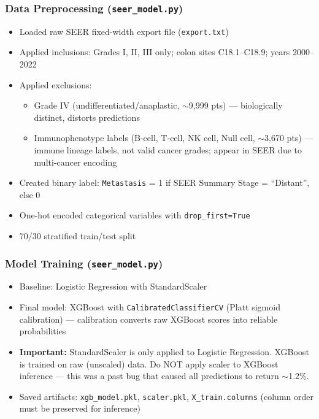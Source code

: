 \documentclass[11pt,letterpaper]{article}
\begin{document}
\subsubsection{Data Preprocessing (\texttt{seer\_model.py})}
\begin{itemize}
  \item Loaded raw SEER fixed-width export file (\texttt{export.txt})
  \item Applied inclusions: Grades I, II, III only; colon sites C18.1–C18.9;
        years 2000–2022
  \item Applied exclusions:
    \begin{itemize}
      \item Grade IV (undifferentiated/anaplastic, $\sim$9,999 pts) —
            biologically distinct, distorts predictions
      \item Immunophenotype labels (B-cell, T-cell, NK cell, Null cell,
            $\sim$3,670 pts) — immune lineage labels, not valid cancer grades;
            appear in SEER due to multi-cancer encoding
    \end{itemize}
  \item Created binary label: \texttt{Metastasis} = 1 if SEER Summary Stage = ``Distant'',
        else 0
  \item One-hot encoded categorical variables with \texttt{drop\_first=True}
  \item 70/30 stratified train/test split
\end{itemize}

\subsubsection{Model Training (\texttt{seer\_model.py})}
\begin{itemize}
  \item Baseline: Logistic Regression with StandardScaler
  \item Final model: XGBoost with \texttt{CalibratedClassifierCV}
        (Platt sigmoid calibration) — calibration converts raw XGBoost scores
        into reliable probabilities
  \item \textbf{Important:} StandardScaler is only applied to Logistic Regression.
        XGBoost is trained on raw (unscaled) data. Do NOT apply scaler to XGBoost
        inference — this was a past bug that caused all predictions to return $\sim$1.2\%.
  \item Saved artifacts: \texttt{xgb\_model.pkl}, \texttt{scaler.pkl},
        \texttt{X\_train.columns} (column order must be preserved for inference)
\end{itemize}
\end{document}
